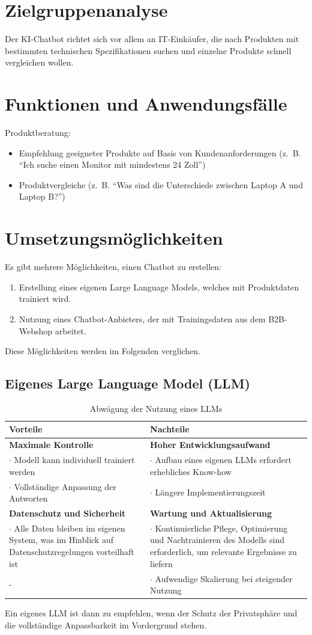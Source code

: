 \documentclass[%
	12pt,
	a4paper,
	oneside,
	parskip=full
]{scrbook}
\begin{document}
\section{Zielgruppenanalyse}
Der KI-Chatbot richtet sich vor allem an IT-Einkäufer, die nach Produkten mit bestimmten technischen Spezifikationen suchen und einzelne Produkte schnell vergleichen wollen.
\section{Funktionen und Anwendungsfälle}
Produktberatung:
\begin{itemize}
	\item Empfehlung geeigneter Produkte auf Basis von Kundenanforderungen (z.~B. \enquote{Ich suche einen Monitor mit mindestens 24 Zoll})
	\item Produktvergleiche (z.~B. \enquote{Was sind die Unterschiede zwischen Laptop A und Laptop B?})
\end{itemize}
\section{Umsetzungsmöglichkeiten}
Es gibt mehrere Möglichkeiten, einen Chatbot zu erstellen:
\begin{enumerate}
	\item Erstellung eines eigenen Large Language Models, welches mit Produktdaten trainiert wird.
	\item Nutzung eines Chatbot-Anbieters, der mit Trainingsdaten aus dem B2B-Webshop arbeitet.
\end{enumerate}
Diese Möglichkeiten werden im Folgenden verglichen.
\subsection{Eigenes Large Language Model (LLM)}
\begin{table}[ht]
	\centering
	\begin{tabularx}{\textwidth}{X|X}
		Vorteile & Nachteile \\ \hline \hline
		\textbf{Maximale Kontrolle} & \textbf{Hoher Entwicklungsaufwand} \\
		$\cdot$ Modell kann individuell trainiert werden & $\cdot$ Aufbau eines eigenen LLMs erfordert erhebliches Know-how\\
		$\cdot$ Vollständige Anpassung der Antworten & $\cdot$ Längere Implementierungszeit\\ \hline
		\textbf{Datenschutz und Sicherheit} & \textbf{Wartung und Aktualisierung} \\
		$\cdot$ Alle Daten bleiben im eigenen System, was im Hinblick auf Datenschutzregelungen vorteilhaft ist & $\cdot$ Kontinuierliche Pflege, Optimierung und Nachtrainieren des Modells sind erforderlich, um relevante Ergebnisse zu liefern \\
		- & $\cdot$ Aufwendige Skalierung bei steigender Nutzung \\
	\end{tabularx}
	\caption{Abwägung der Nutzung eines LLMs}
\end{table}
Ein eigenes LLM ist dann zu empfehlen, wenn der Schutz der Privatsphäre und die vollständige Anpassbarkeit im Vordergrund stehen.
\end{document}
